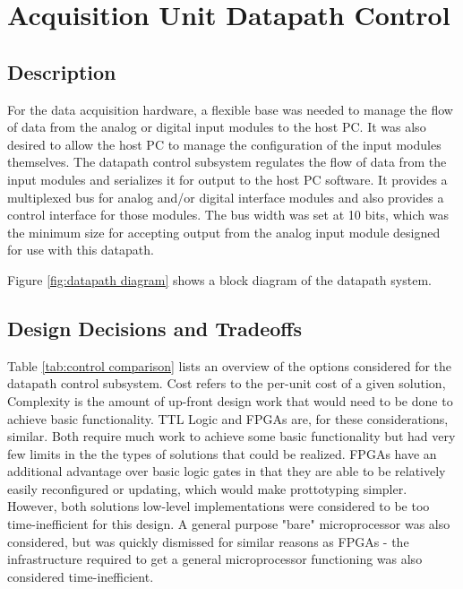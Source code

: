 \section[Datapath Control]{Acquisition Unit Datapath Control}
\subsection{Description}
For the data acquisition hardware, a flexible base was needed to manage the 
flow of data from the analog or digital input modules to the host PC. It was 
also desired to allow the host PC to manage the configuration of the input 
modules themselves. The datapath control subsystem regulates the flow of data 
from the input modules and serializes it for output to 
the host PC software. It provides a multiplexed bus for analog and/or 
digital interface modules and also provides a control interface for those 
modules. The bus width was set at 10 bits, which was the minimum size for
 accepting output from the analog input module designed for use with this 
datapath.

Figure \ref{fig:datapath diagram} shows a block diagram of the datapath system.
 

\subsection[Tradeoffs]{Design Decisions and Tradeoffs} 
Table \ref{tab:control comparison} lists an overview of the options considered
 for the datapath control subsystem. Cost refers to the per-unit cost of a 
given solution, Complexity is the amount of up-front design work that would
 need to be done to achieve basic functionality. TTL Logic and FPGAs are, for
 these considerations, similar. Both require much work to achieve some basic
 functionality but had very few limits in the the types of solutions that
 could be realized. FPGAs have an additional advantage over basic logic gates
 in that they are able to be relatively easily reconfigured or updating, which
 would make prottotyping simpler. However, both solutions low-level
 implementations were considered to be too time-inefficient for this design.
 A general purpose "bare" microprocessor was also considered, but was quickly
 dismissed for similar reasons as FPGAs - the infrastructure required to get
 a general microprocessor functioning was also considered time-inefficient.

